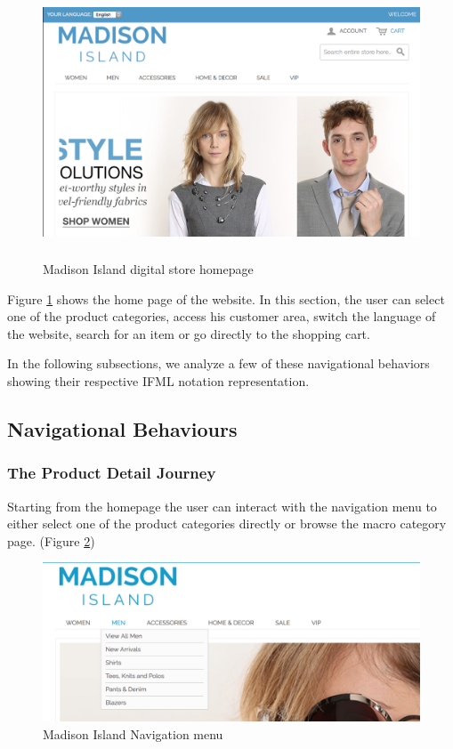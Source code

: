 \vspace{0.5cm}
\begin{figure}[htbp]
  \centering
    \includegraphics[height=8cm]{images/home.png}
  \caption{Madison Island digital store homepage}
  \label{fig:home}
\end{figure}
\vspace{0.5cm}


Figure \ref{fig:home} shows the home page of the website. In this section, the user can select one of the product categories, access his customer area, switch the language of the website, search for an item or go directly to the shopping cart. 

In the following subsections, we analyze a few of these navigational behaviors showing their respective IFML notation representation.

\subsection{Navigational Behaviours}

\subsubsection{The Product Detail Journey}

Starting from the homepage the user can interact with the navigation menu to either select one of the product categories directly or browse the macro category page.  (Figure \ref{fig:navigation})

\vspace{0.5cm}
\begin{figure}[htbp]
  \centering
    \includegraphics[width=12cm]{images/madison/navigation.png}
  \caption{Madison Island Navigation menu}
  \label{fig:navigation}
\end{figure}
\vspace{0.5cm}

